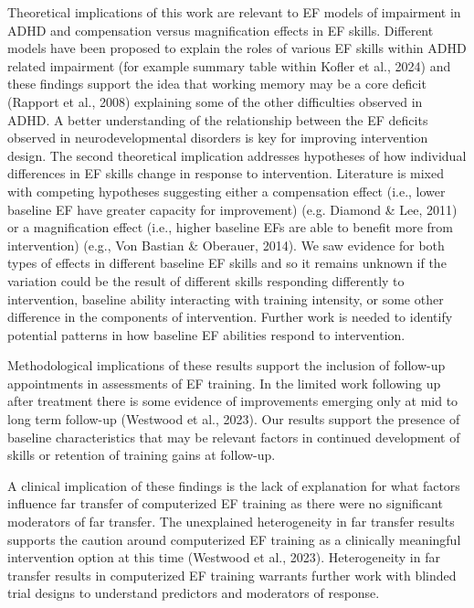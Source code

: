 \documentclass[
  letterpaper,
]{ut-thesis}
\begin{document}
Theoretical implications of this work are relevant to EF models of
impairment in ADHD and compensation versus magnification effects in EF
skills. Different models have been proposed to explain the roles of
various EF skills within ADHD related impairment (for example summary
table within Kofler et al., 2024) and these findings support the idea
that working memory may be a core deficit (Rapport et al., 2008)
explaining some of the other difficulties observed in ADHD. A better
understanding of the relationship between the EF deficits observed in
neurodevelopmental disorders is key for improving intervention design.
The second theoretical implication addresses hypotheses of how
individual differences in EF skills change in response to intervention.
Literature is mixed with competing hypotheses suggesting either a
compensation effect (i.e., lower baseline EF have greater capacity for
improvement) (e.g. Diamond \& Lee, 2011) or a magnification effect
(i.e., higher baseline EFs are able to benefit more from intervention)
(e.g., Von Bastian \& Oberauer, 2014). We saw evidence for both types of
effects in different baseline EF skills and so it remains unknown if the
variation could be the result of different skills responding differently
to intervention, baseline ability interacting with training intensity,
or some other difference in the components of intervention. Further work
is needed to identify potential patterns in how baseline EF abilities
respond to intervention.

Methodological implications of these results support the inclusion of
follow-up appointments in assessments of EF training. In the limited
work following up after treatment there is some evidence of improvements
emerging only at mid to long term follow-up (Westwood et al., 2023). Our
results support the presence of baseline characteristics that may be
relevant factors in continued development of skills or retention of
training gains at follow-up.

A clinical implication of these findings is the lack of explanation for
what factors influence far transfer of computerized EF training as there
were no significant moderators of far transfer. The unexplained
heterogeneity in far transfer results supports the caution around
computerized EF training as a clinically meaningful intervention option
at this time (Westwood et al., 2023). Heterogeneity in far transfer
results in computerized EF training warrants further work with blinded
trial designs to understand predictors and moderators of response.
\end{document}
